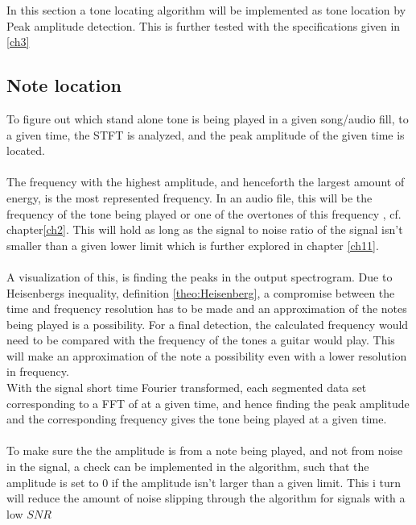 \label{sec:peak_detection}
In this section a tone locating algorithm will be implemented as tone location by Peak amplitude detection.
This is further tested with the specifications given in \ref{ch3}
\subsection{Note location}
To figure out which stand alone tone is being played in a given song/audio fill, to a given time, the STFT is analyzed, and the peak amplitude of the given time is located.\\
\\
The frequency with the highest amplitude, and henceforth the largest amount of energy, is the most represented frequency. 
In an audio file, this will be the frequency of the tone being played or one of the overtones of this frequency , cf. chapter\ref{ch2}.
This will hold as long as the signal to noise ratio of the signal isn't smaller than a given lower limit which is further explored in chapter \ref{ch11}.
\\
\\
A visualization of this, is finding the peaks in the output spectrogram.
Due to Heisenbergs inequality, definition \ref{theo:Heisenberg}, a compromise between the time and frequency resolution has to be made and an approximation of the notes being played is a possibility.
For a final detection, the calculated frequency would need to be compared with the frequency of the tones a guitar would play. 
This will make an approximation of the note a possibility even with a lower resolution in frequency.
\\
With the signal short time Fourier transformed, each segmented data set corresponding to a FFT of at a given time, and hence finding the peak amplitude and the corresponding frequency gives the tone being played at a given time.
\\\\
To make sure the the amplitude is from a note being played, and not from noise in the signal, a check can be implemented in the algorithm, such that the amplitude is set to $0$ if the amplitude isn't larger than a given limit.
This i turn will reduce the amount of noise slipping through the algorithm for signals with a low $SNR$

